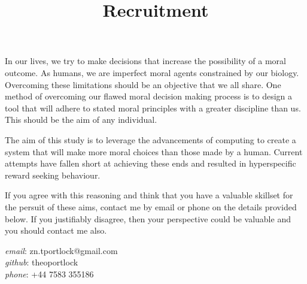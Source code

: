\documentclass[12pt]{article}
\title{Recruitment}
\date{\vspace{-5ex}}
\begin{document}
\maketitle

In our lives, we try to make decisions that increase the possibility of a moral outcome.
As humans, we are imperfect moral agents constrained by our biology.
Overcoming these limitations should be an objective that we all share.
One method of overcoming our flawed moral decision making process is to design a tool that will adhere to stated moral principles with a greater discipline than us.
This should be the aim of any individual.

\vspace{5mm}
\noindent
The aim of this study is to leverage the advancements of computing to create a system that will make more moral choices than those made by a human.
Current attempts have fallen short at achieving these ends and resulted in hyperspecific reward seeking behaviour.

\vspace{5mm}
\noindent
If you agree with this reasoning and think that you have a valuable skillset for the persuit of these aims, contact me by email or phone on the details provided below.
If you justifiably disagree, then your perspective could be valuable and you should contact me also.

\vspace{5mm}
\noindent
\emph{email}:	zn.tportlock@gmail.com \\
\emph{github}:	theoportlock \\
\emph{phone}:	+44 7583 355186
\end{document}
